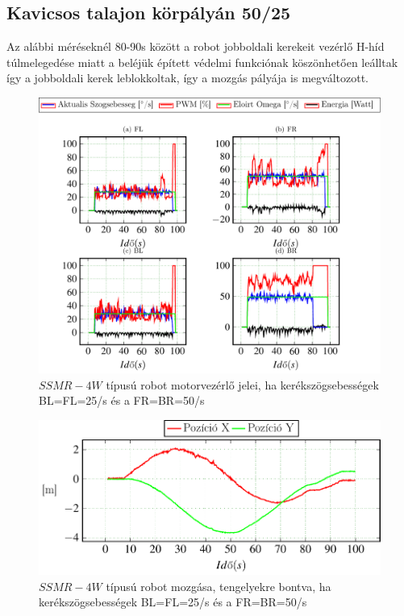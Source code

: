 \subsection{Kavicsos talajon körpályán 50/25}

Az alábbi méréseknél 80-90s között a robot jobboldali kerekeit vezérlő H-híd túlmelegedése miatt a beléjük épített védelmi funkciónak köszönhetően leálltak így a jobboldali kerek leblokkoltak, így a mozgás pályája is megváltozott.


\renewcommand{\GlobalPath}{Meresek/Mozgasok/NormalMukodes/Korpalya_07_03_Kavicsos/}
\renewcommand{\secondImage}{*}

%

%



\begin{figure}[H]
  \includegraphics{tikz/KorP0703x.pdf}
  \caption{$SSMR-4W$ típusú robot motorvezérlő jelei, ha kerékszögsebességek BL=FL=25\degree/s és a FR=BR=50\degree/s}
  \label{fig:KorP0703x}
\end{figure}


\begin{figure}[H]
  \includegraphics{tikz/KorP0703a.pdf}
  \caption{$SSMR-4W$ típusú robot mozgása, tengelyekre bontva, ha kerékszögsebességek BL=FL=25\degree/s és a FR=BR=50\degree/s }
  \label{fig:KorP0703a}
\end{figure}



